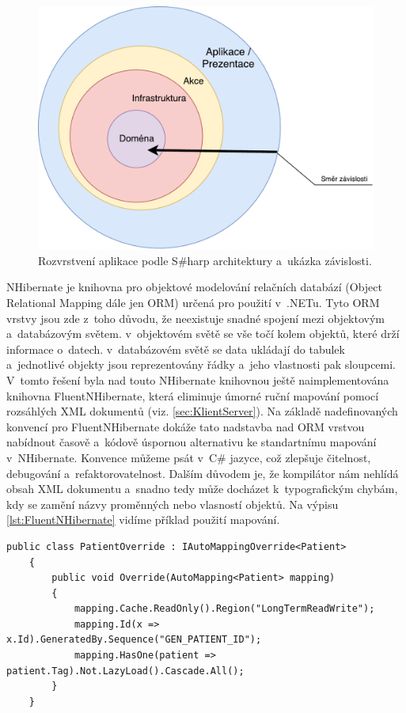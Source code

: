 \begin{figure} [H]
	\centering
	\includegraphics[width=13cm]{../SharpArchitecture.pdf}
	\caption{Rozvrstvení aplikace podle S\#harp architektury a~ukázka závislosti.}
	\label{fig:sharpArch}
\end{figure}


NHibernate je knihovna pro objektové modelování relačních databází (Object Relational Mapping dále jen ORM) určená pro použití v~.NETu. Tyto ORM vrstvy jsou zde z~toho důvodu, že neexistuje snadné spojení mezi objektovým a~databázovým světem. v~objektovém světě se vše točí kolem objektů, které drží informace o~datech. v~databázovém světě se data ukládají do tabulek a~jednotlivé objekty jsou reprezentovány řádky a~jeho vlastnosti pak sloupcemi. V~tomto řešení byla nad touto NHibernate knihovnou ještě naimplementována knihovna FluentNHibernate, která eliminuje úmorné ruční mapování pomocí rozsáhlých XML dokumentů (viz. \ref{sec:KlientServer}). Na základě nadefinovaných konvencí pro FluentNHibernate dokáže tato nadstavba nad ORM vrstvou nabídnout časově a~kódově úspornou alternativu ke standartnímu mapování v~NHibernate. Konvence můžeme psát v~C\# jazyce, což zlepšuje čitelnost, debugování a~refaktorovatelnost. Dalším důvodem je, že kompilátor nám nehlídá obsah XML dokumentu a~snadno tedy může docházet k~typografickým chybám, kdy se zamění názvy proměnných nebo vlasností objektů. Na výpisu \ref{lst:FluentNHibernate} vidíme příklad použití mapování.\cite{24}

\begin{lstlisting}[numbers=none, caption={Ukázka mapování pomocí FluentNHibernate}, label=lst:FluentNHibernate]
	public class PatientOverride : IAutoMappingOverride<Patient>
	{
		public void Override(AutoMapping<Patient> mapping)
		{
			mapping.Cache.ReadOnly().Region("LongTermReadWrite");
			mapping.Id(x => x.Id).GeneratedBy.Sequence("GEN_PATIENT_ID");
			mapping.HasOne(patient => patient.Tag).Not.LazyLoad().Cascade.All(); 
		}
	}
\end{lstlisting}

